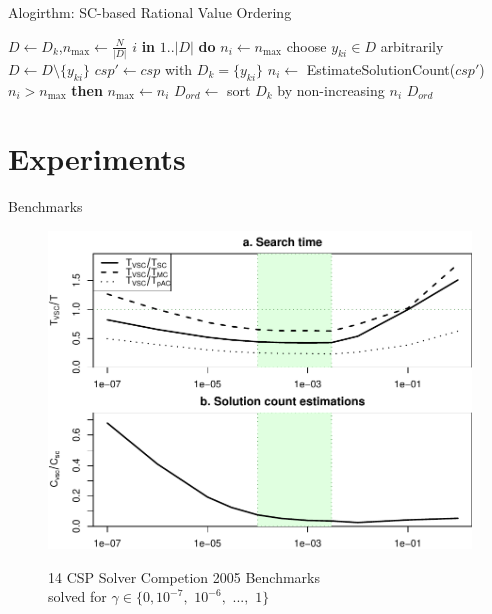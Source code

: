 \documentclass{beamer}
\begin{document}
\begin{frame}{Alogirthm: SC-based Rational Value Ordering}
\begin{algorithmic}[1]
\label{alg:csp-solcount-args}
  \State $D \gets D_k$,\hspace{1em}$n_\mathrm{max} \gets \frac N {|D|}$
   {$i$ {\bf in} $1..|D|$} {\bf do} $n_i \gets n_\mathrm{max}$
   \label{alg:csp-solcount-while}
    \State choose $y_{ki} \in D$ arbitrarily
    \State $D \gets D \setminus \{y_{ki}\}$
    \State $csp' \gets csp$ with $D_k=\{y_{ki}\}$
    \State $n_i \gets$ {\sc EstimateSolutionCount}($csp'$) \label{alg:csp-estimate-solution-count}
     {$n_i>n_\mathrm{max}$} {\bf then} $n_\mathrm{max} \gets n_i$
  \EndWhile \label{alg:csp-solcount-endwhile}
  \State $D_{ord} \gets$ sort $D_k$ by non-increasing $n_i$ \label{alg:csp-solcount-sort}
   $D_{ord}$ \label{alg:csp-solcount-return}
\EndProcedure
\end{algorithmic}
\end{frame}

\section{Experiments}

\begin{frame}{Benchmarks}
\vspace{-24pt}
\begin{figure}[h]
\centering
\includegraphics[scale=0.6]{benchmarks.pdf}

14 CSP Solver Competion 2005 Benchmarks\\
solved for $\gamma \in \{0, 10^{-7},$ $10^{-6},$ $...,$ $1\}$
\end{figure}
\end{frame}
\end{document}
